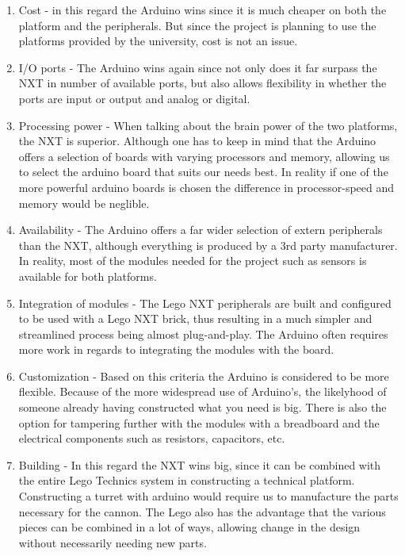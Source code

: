 \begin{enumerate}
  \item Cost - in this regard the Arduino wins since it is much cheaper on both the platform and the peripherals. But since the project is planning to use
  the platforms provided by the university, cost is not an issue.
  \item I/O ports - The Arduino wins again since not only does it far surpass the NXT in number of available ports,
  but also allows flexibility in whether the ports are input or output and analog or digital.
  \item Processing power - When talking about the brain power of the two platforms, the NXT is superior. Although one has to
  keep in mind that the Arduino offers a selection of boards with varying processors and memory, allowing us to select the arduino
  board that suits our needs best. In reality if one of the more powerful arduino boards is chosen the difference in processor-speed and memory
  would be neglible.
  \item Availability - The Arduino offers a far wider selection of extern peripherals than the NXT, although everything is produced by a 3rd party manufacturer.
  In reality, most of the modules needed for the project such as sensors is available for both platforms.
  \item Integration of modules - The Lego NXT peripherals are built and configured to be used with a Lego NXT brick, thus resulting in a much simpler
  and streamlined process being almost plug-and-play. The Arduino often requires more work in regards to integrating the modules with the board.
  \item Customization - Based on this criteria the Arduino is considered to be more flexible. Because of the more widespread use of Arduino's, the likelyhood of someone
  already having constructed what you need is big. There is also the option for tampering further with the modules with a breadboard and the electrical components such as resistors, capacitors, etc.
  \item Building - In this regard the NXT wins big, since it can be combined with the entire Lego Technics system in constructing a technical platform. Constructing a turret with arduino would
  require us to manufacture the parts necessary for the cannon. The Lego also has the advantage that the various pieces can be combined in a lot of ways, allowing change in the design without necessarily needing new parts.
\end{enumerate}

